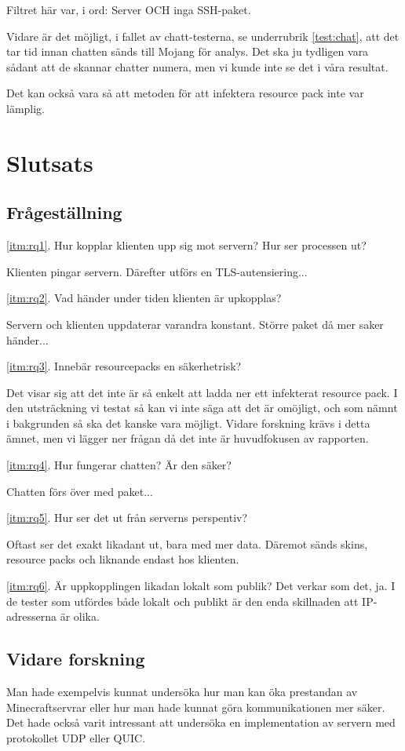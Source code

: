\documentclass[journal,comsoc]{IEEEtran}
\begin{document}
Filtret här var, i ord: Server OCH inga SSH-paket.

Vidare är det möjligt, i fallet av chatt-testerna, se underrubrik \ref{test:chat}, att det tar tid innan chatten sänds till Mojang för analys. Det ska ju tydligen vara sådant att de skannar chatter numera, men vi kunde inte se det i våra resultat.

Det kan också vara så att metoden för att infektera resource pack inte var lämplig.
\section{Slutsats}
\subsection{Frågeställning}
\ref{itm:rq1}. Hur kopplar klienten upp sig mot servern? Hur ser processen ut?

Klienten pingar servern. Därefter utförs en TLS-autensiering...

\ref{itm:rq2}. Vad händer under tiden klienten är upkopplas?

Servern och klienten uppdaterar varandra konstant. Större paket då mer saker händer...

\ref{itm:rq3}. Innebär resourcepacks en säkerhetrisk? 

Det visar sig att det inte är så enkelt att ladda ner ett infekterat resource pack. I den utsträckning vi testat så kan vi inte säga att det är omöjligt, och som nämnt i bakgrunden så ska det kanske vara möjligt. Vidare forskning krävs i detta ämnet, men vi lägger ner frågan då det inte är huvudfokusen av rapporten. 

\ref{itm:rq4}. Hur fungerar chatten? Är den säker? 

Chatten förs över med paket...

\ref{itm:rq5}. Hur ser det ut från serverns perspentiv?

Oftast ser det exakt likadant ut, bara med mer data. Däremot sänds skins, resource packs och liknande endast hos klienten.

\ref{itm:rq6}. Är uppkopplingen likadan lokalt som publik? 
Det verkar som det, ja. I de tester som utfördes både lokalt och publikt är den enda skillnaden att IP-adresserna är olika.

\subsection{Vidare forskning}
Man hade exempelvis kunnat undersöka hur man kan öka prestandan av Minecraftservrar eller hur man hade kunnat göra kommunikationen mer säker. Det hade också varit intressant att undersöka en implementation av servern med protokollet UDP eller QUIC.
\end{document}
